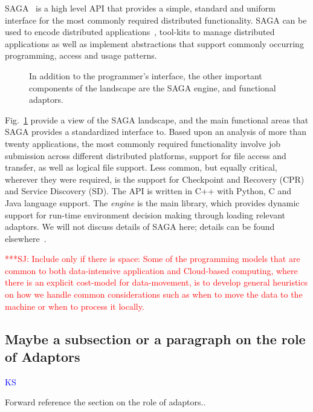 \documentclass[conference,final]{IEEEtran}
\newcommand{\jhanote}[1]{ {\textcolor{red} { ***SJ: #1 }}}
\newcommand{\jhanote}[1]{}
\begin{document}
SAGA~\cite{saga-core} is a high level API that provides a simple,
standard and uniform interface for the most commonly required
distributed functionality.  SAGA can be used to encode distributed
applications~\cite{saga_escience07_short, saga_tg08}, tool-kits to
manage distributed applications as well as implement abstractions that
support commonly occurring programming, access and usage patterns.

\begin{figure}[t]
\vspace{-2em}
\caption{In addition to the programmer's interface,
  the other important components of the landscape are the SAGA engine,
  and functional adaptors.} \vspace{-2em}
\label{saga_figure}
\end{figure}

Fig.~\ref{saga_figure} provide a view of the SAGA landscape, and the
main functional areas that SAGA provides a standardized interface
to. Based upon an analysis of more than twenty applications, the most
commonly required functionality involve job submission across
different distributed platforms, support for file access and transfer,
as well as logical file support. Less common, but equally critical,
wherever they were required, is the support for Checkpoint and
Recovery (CPR) and Service Discovery (SD).  The API is written in C++
with Python, C and Java language support. The {\it engine} is the main
library, which provides dynamic support for run-time environment
decision making through loading relevant adaptors. We will not discuss
details of SAGA here; details can be found elsewhere~\cite{saga_url}.

\jhanote{Include only if there is space: Some of the programming
  models that are common to both data-intensive application and
  Cloud-based computing, where there is an explicit cost-model for
  data-movement, is to develop general heuristics on how we handle
  common considerations such as when to move the data to the machine
  or when to process it locally.}

\subsection{Maybe  a subsection or a paragraph on the role of Adaptors} {\textcolor{blue} {KS}}



Forward reference the section on the role of adaptors.. 
\end{document}
